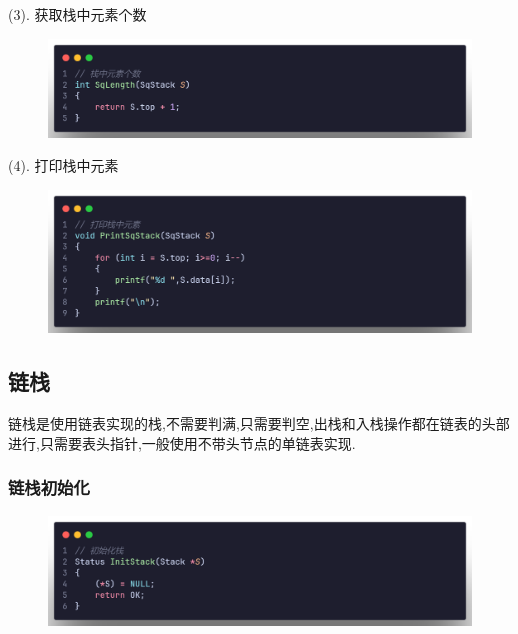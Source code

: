(3). 获取栈中元素个数

\begin{figure}[H]
    \centering
    \includegraphics[scale=0.2]{"figure/Note/Stack/SqN.png"}
\end{figure}

(4). 打印栈中元素

\begin{figure}[H]
    \centering
    \includegraphics[scale=0.2]{"figure/Note/Stack/SqPrint.png"}
\end{figure}

\subsection{链栈}
\begin{definition}[链栈]
    链栈是使用链表实现的栈,不需要判满,只需要判空,出栈和入栈操作都在链表的头部进行,只需要表头指针,一般使用不带头节点的单链表实现.
\end{definition}

\subsubsection{链栈初始化}

\begin{figure}[H]
    \centering
    \includegraphics[scale=0.2]{"figure/Note/Stack/SlInit.png"}
\end{figure}

